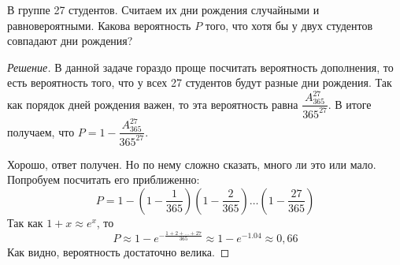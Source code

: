 \documentclass[a4paper,12pt]{article}
\begin{document}
\begin{problem}
	В группе 27 студентов. Считаем их дни рождения случайными и равновероятными. Какова вероятность \(P\) того, что хотя бы у двух студентов совпадают дни рождения?
\end{problem}
\begin{proof}[Решение]
	В данной задаче гораздо проще посчитать вероятность дополнения, то есть вероятность того, что у всех 27 студентов будут разные дни рождения. Так как порядок дней рождения важен, то эта вероятность равна \(\dfrac{A_{365}^{27}}{365^{27}}\). В итоге получаем, что \(P = 1 - \dfrac{A_{365}^{27}}{365^{27}}\).
	
	Хорошо, ответ получен. Но по нему сложно сказать, много ли это или мало. Попробуем посчитать его приближенно:
	\[P = 1 - \left(1 - \frac{1}{365}\right)\left(1 - \frac{2}{365}\right)\ldots\left(1 - \frac{27}{365}\right)\]
	Так как \(1 + x \approx e^x\), то
	\[P \approx 1 - e^{-\frac{1 + 2 + \ldots + 27}{365}} \approx 1 - e^{-1.04} \approx 0,66\]
	Как видно, вероятность достаточно велика.
\end{proof}
\end{document}

